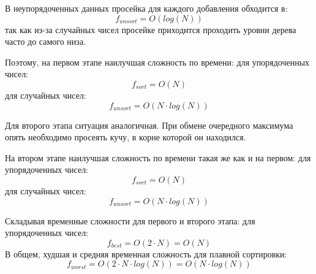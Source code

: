В неупорядоченных данных просейка для каждого добавления обходится в:
\begin{equation}
f_{unsort} = O(log(N))
\end{equation}
так как из-за случайных чисел просейке приходится проходить уровни дерева часто до самого низа.

Поэтому, на первом этапе наилучшая сложность по времени:
для упорядоченных чисел:
\begin{equation}
f_{sort} = O(N)
\end{equation} 
для случайных чисел:
\begin{equation}
f_{unsort} = O(N \cdot log(N))
\end{equation} 

Для второго этапа ситуация аналогичная. При обмене очередного максимума опять необходимо просеять кучу, в корне которой он находился.

На втором этапе наилучшая сложность по времени такая же как и на первом:
для упорядоченных чисел:
\begin{equation}
f_{sort} = O(N)
\end{equation} 
для случайных чисел:
\begin{equation}
f_{unsort} = O(N \cdot log(N))
\end{equation} 

Складывая временные сложности для первого и второго этапа:
для упорядоченных чисел:
\begin{equation}
f_{best} = O(2 \cdot N) = O(N)
\end{equation}  
В общем, худшая и средняя временная сложность для плавной сортировки:
\begin{equation}
f_{worst} = O(2 \cdot N \cdot log(N)) = O(N \cdot log(N))
\end{equation} 



